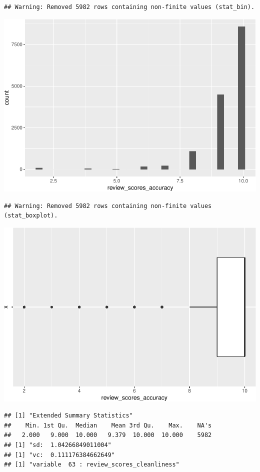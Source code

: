 \begin{verbatim}
## Warning: Removed 5982 rows containing non-finite values (stat_bin).
\end{verbatim}

\includegraphics{anal_files/figure-latex/unnamed-chunk-9-44.pdf}

\begin{verbatim}
## Warning: Removed 5982 rows containing non-finite values (stat_boxplot).
\end{verbatim}

\includegraphics{anal_files/figure-latex/unnamed-chunk-9-45.pdf}

\begin{verbatim}
## [1] "Extended Summary Statistics"
##    Min. 1st Qu.  Median    Mean 3rd Qu.    Max.    NA's 
##   2.000   9.000  10.000   9.379  10.000  10.000    5982 
## [1] "sd:  1.04266849011004"
## [1] "vc:  0.111176384662649"
## [1] "variable  63 : review_scores_cleanliness"
\end{verbatim}

